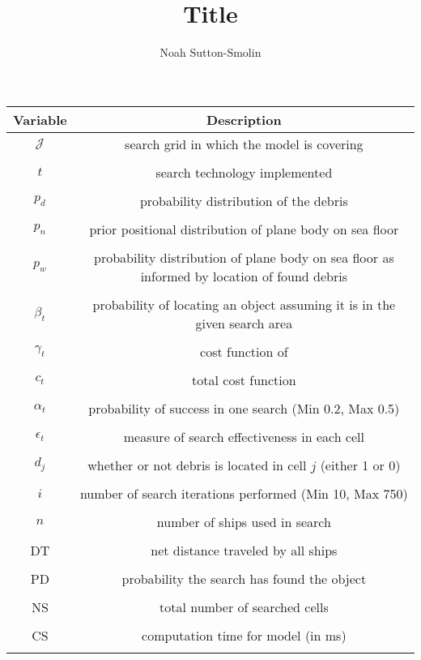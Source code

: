 \documentclass[a4paper]{article}
\title{Title}
\author{Noah Sutton-Smolin}
\begin{document}
\begin{tabular}{|c|c|}
\hline
\textbf{Variable} & \textbf{Description}\\
\hline\hline
$\mathcal{J}$ & search grid in which the model is covering \\\\ \hline 
$t$ & search technology implemented\\\\ \hline
$p_d$ & probability distribution of the debris \\\\ \hline
$p_n$ & prior positional distribution of plane body on sea floor  \\\\ \hline
$p_w$ & probability distribution of plane body on sea floor as informed by location of found debris \\\\ \hline
$\beta_t$ & probability of locating an object assuming it is in the given search area \\\\ \hline
$\gamma_t$ & cost function of \\\\ \hline
$c_t$ & total cost function \\\\ \hline
$\alpha_t$ & probability of success in one search (Min 0.2, Max 0.5) \\\\ \hline
$\epsilon_t$ & measure of search effectiveness in each cell \\\\ \hline
$d_j$ & whether or not debris is located in cell $j$ (either 1 or 0) \\\\ \hline
$i$ & number of search iterations performed (Min 10, Max 750) \\\\ \hline
$n$ & number of ships used in search \\\\ \hline
DT & net distance traveled by all ships \\\\ \hline
PD & probability the search has found the object \\\\ \hline
NS & total number of searched cells \\\\ \hline
CS & computation time for model (in ms) \\\\ \hline

\hline\hline     
\end{tabular}
\end{document}
